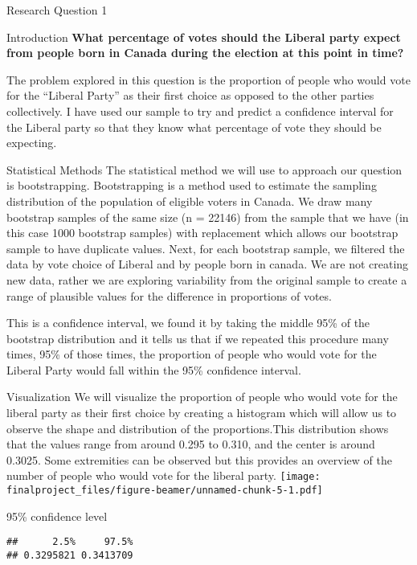\documentclass[
  9pt,
  ignorenonframetext,
]{beamer}
\begin{document}
\begin{frame}{Research Question 1}
\protect\hypertarget{research-question-1}{}
\begin{block}{Introduction}
\protect\hypertarget{introduction-1}{}
\textbf{What percentage of votes should the Liberal party expect from
people born in Canada during the election at this point in time?}

The problem explored in this question is the proportion of people who
would vote for the ``Liberal Party'' as their first choice as opposed to
the other parties collectively. I have used our sample to try and
predict a confidence interval for the Liberal party so that they know
what percentage of vote they should be expecting.
\end{block}

\begin{block}{Statistical Methods}
\protect\hypertarget{statistical-methods}{}
The statistical method we will use to approach our question is
bootstrapping. Bootstrapping is a method used to estimate the sampling
distribution of the population of eligible voters in Canada. We draw
many bootstrap samples of the same size (n = 22146) from the sample that
we have (in this case 1000 bootstrap samples) with replacement which
allows our bootstrap sample to have duplicate values. Next, for each
bootstrap sample, we filtered the data by vote choice of Liberal and by
people born in canada. We are not creating new data, rather we are
exploring variability from the original sample to create a range of
plausible values for the difference in proportions of votes.

This is a confidence interval, we found it by taking the middle 95\% of
the bootstrap distribution and it tells us that if we repeated this
procedure many times, 95\% of those times, the proportion of people who
would vote for the Liberal Party would fall within the 95\% confidence
interval.
\end{block}
\end{frame}

\begin{frame}[fragile]
\begin{block}{Visualization}
\protect\hypertarget{visualization}{}
We will visualize the proportion of people who would vote for the
liberal party as their first choice by creating a histogram which will
allow us to observe the shape and distribution of the proportions.This
distribution shows that the values range from around 0.295 to 0.310, and
the center is around 0.3025. Some extremities can be observed but this
provides an overview of the number of people who would vote for the
liberal party.
\texttt{[image: finalproject\_files/figure-beamer/unnamed-chunk-5-1.pdf]}
\end{block}

\begin{block}{95\% confidence level}
\protect\hypertarget{confidence-level}{}
\begin{verbatim}
##      2.5%     97.5% 
## 0.3295821 0.3413709
\end{verbatim}
\end{block}
\end{frame}
\end{document}
